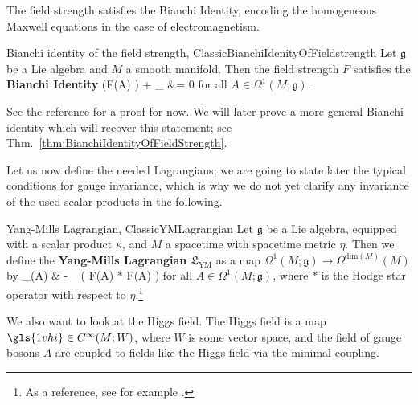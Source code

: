 The field strength satisfies the Bianchi Identity, encoding the homogeneous Maxwell equations in the case of electromagnetism.

\begin{theorems}{Bianchi identity of the field strength, \newline \cite[Theorem 5.14.2; page 311]{hamilton}}{ClassicBianchiIdenityOfFieldstrength}
Let $\mathfrak{g}$ be a Lie algebra and $M$ a smooth manifold. Then the field strength $F$ satisfies the \textbf{Bianchi Identity}
\ba
{}\bigl(F(A) \bigr)
	+ _{}
&=
0
\ea
for all $A \in \Omega^1(M; \mathfrak{g})$.
\end{theorems}

\begin{remark}
\leavevmode\newline
See the reference for a proof for now. We will later prove a more general Bianchi identity which will recover this statement; see Thm.~\ref{thm:BianchiIdentityOfFieldStrength}.
\end{remark}

Let us now define the needed Lagrangians; we are going to state later the typical conditions for gauge invariance, which is why we do not yet clarify any invariance of the used scalar products in the following.

\begin{definitions}{Yang-Mills Lagrangian, \cite[Definition 7.3.1; page 414]{hamilton}}{ClassicYMLagrangian}
Let $\mathfrak{g}$ be a Lie algebra, equipped with a scalar product $\kappa$, and $M$ a spacetime with spacetime metric $\eta$. Then we define the \textbf{Yang-Mills Lagrangian $\mathfrak{L}_{\mathrm{YM}}$} as a map $\Omega^1(M; \mathfrak{g}) \to \Omega^{\mathrm{dim}(M)}(M)$ by 
\ba
{}_{}(A)
&\coloneqq
- ~ \kappa\bigl( F(A) \stackrel{\wedge}{,} * F(A) \bigr)
\ea
for all $A \in \Omega^1(M; \mathfrak{g})$, where $*$ is the Hodge star operator with respect to $\eta$.\footnote{As a reference, see for example \cite[Definition 7.2.4; page 408]{hamilton}.}
\end{definitions}

We also want to look at the Higgs field. The Higgs field is a map $\gls{1vhi} \in C^\infty(M;W)$, where $W$ is some vector space, and the field of gauge bosons $A$ are coupled to fields like the Higgs field via the minimal coupling.


